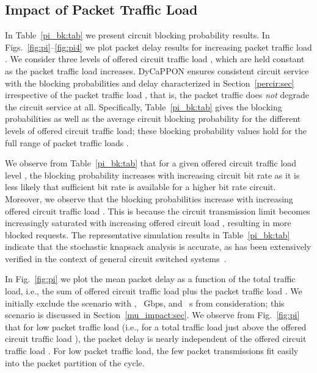 \documentclass[article]{IEEEtran}
\begin{document}
\subsection{Impact of Packet Traffic Load }
\label{pi_impact:sec}
In Table~\ref{pi_bk:tab} we present circuit blocking probability results.
In Figs.~\ref{fig:pi}--\ref{fig:pi4} we plot
packet delay results for increasing packet traffic load .
We consider three levels of offered circuit traffic load ,
which are held constant as the packet traffic load  increases.
DyCaPPON ensures consistent circuit service with the
blocking probabilities and
delay characterized in Section~\ref{percir:sec} irrespective
of the packet traffic load , that is, the packet traffic does
\textit{not} degrade the circuit service at all.
Specifically, Table~\ref{pi_bk:tab} gives
the blocking probabilities  as well as the average
circuit blocking probability 
for the different levels of offered circuit traffic load;
these blocking probability values hold for the full range
of packet traffic loads .

We observe from Table~\ref{pi_bk:tab} that for a given
offered circuit traffic load level , the blocking probability increases
with increasing circuit bit rate  as it is less likely that sufficient
bit rate is available for a higher bit rate circuit.
Moreover, we observe that the blocking probabilities increase with
increasing offered circuit traffic load .
This is because the circuit transmission limit  becomes
increasingly saturated with increasing offered circuit load
, resulting in more blocked requests.
The representative simulation results in Table~\ref{pi_bk:tab}
indicate that the stochastic knapsack analysis is accurate,
as has been extensively verified
in the context of general circuit switched systems~\cite{Ross95}.

In Fig.~\ref{fig:pi} we plot the mean packet delay as
a function of the total traffic load, i.e., the sum of offered
circuit traffic load  plus the packet traffic load .
We initially exclude the scenario with , ~Gbps,
and ~s from consideration; this scenario is discussed in
Section~\ref{mu_impact:sec}.
We observe from Fig.~\ref{fig:pi} that for low packet traffic load 
(i.e., for a total traffic load  just above the offered
circuit traffic load ),
the packet delay is nearly independent of the offered circuit traffic
load .
For low packet traffic load, the few packet transmissions
fit easily into the packet partition of the cycle.
\end{document}
